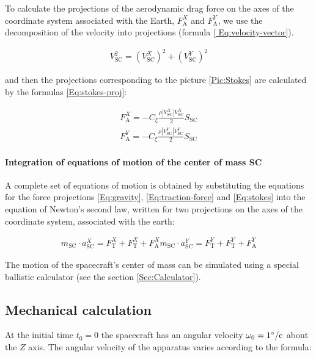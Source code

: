 \documentclass[12pt,a4paper]{article}
\begin{document}
To calculate the projections of the aerodynamic drag force on the axes of the coordinate system associated with the Earth, $F_{\text{A}}^X$ and $F_{\text{A}}^Y$, we use the decomposition of the velocity into projections (formula \ref{ Eq:velocity-vector}).

\begin{eqnarray}
  V_{\text{SC}}^2 = \left( V_{\text{SC}}^X \right)^2 + \left( V_{\text{SC}}^Y \right)^2
  \label{Eq:velocity-vector}
\end{eqnarray}

and then the projections corresponding to the picture \ref{Pic:Stokes} are calculated by the formulas
\ref{Eq:stokes-proj}:

\begin{eqnarray}
  F_{\text{A}}^X = - C_\xi \frac{\rho \left| V_{\text{SC}}^X \right| V_{\text{SC}}^X}{2} S_{\text{SC}} \nonumber \\
  F_{\text{A}}^Y = - C_\xi \frac{\rho \left| V_{\text{SC}}^Y \right| V_{\text{SC}}^Y}{2} S_{\text{SC}} \label{Eq:stokes-proj}
\end{eqnarray}

\paragraph{Integration of equations of motion of the center of mass SC}

A complete set of equations of motion is obtained by substituting the equations for the force projections \ref{Eq:gravity}, \ref{Eq:traction-force} and \ref{Eq:stokes} into the equation of Newton's second law, written for two projections on the axes of the coordinate system, associated with the earth:

\begin{eqnarray}
   m_{\text{SC}} \cdot a_{\text{SC}}^X = F_{\text{T}}^X + F_{\text{T}}^X + F_{\text{A} }^X
   m_{\text{SC}} \cdot a_{\text{SC}}^Y = F_{\text{T}}^Y + F_{\text{T}}^Y + F_{\text{A} }^Y
\end{eqnarray}

The motion of the spacecraft's center of mass can be simulated using a special ballistic calculator (see the section \ref{Sec:Calculator}).

\subsection{Mechanical calculation}
\label{Sec:Mechanics}

At the initial time $t_0 = 0$ the spacecraft has an angular velocity $\omega_0 = 1\degree/\text{c}$ about the $Z$ axis. The angular velocity of the apparatus varies according to the formula:
\end{document}

